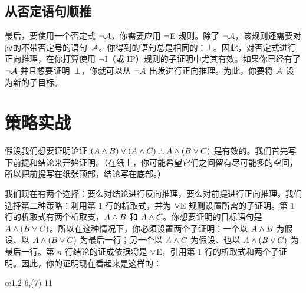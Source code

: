 \subsection*{从否定语句顺推}

最后，要使用一个否定式 $\neg \mathcal{A}$，你需要应用 $\neg$E 规则。除了 $\neg \mathcal{A}$，该规则还需要对应的不带否定号的语句~$\mathcal{A}$。你得到的语句总是相同的：$\bot$。因此，对否定式进行正向推理，在你打算使用 $\neg$I（或 IP）规则的子证明中尤其有效。如果你已经有了 $\neg \mathcal{A}$ 并且想要证明~$\bot$，你就可以从 $\neg \mathcal{A}$ 出发进行正向推理。为此，你要将 $\mathcal{A}$ 设为新的子目标。

\begin{fitchproof}
	\ellipsesline
\end{fitchproof}

\section{策略实战}

假设我们想要证明论证 $(A \eand B) \eor (A \eand C) \therefore A \eand (B \eor C)$ 是有效的。我们首先写下前提和结论来开始证明。（在纸上，你可能希望它们之间留有尽可能多的空间，所以把前提写在纸张顶部，结论写在底部。）


\begin{fitchproof}
   \PR
\ellipsesline
\end{fitchproof}


我们现在有两个选择：要么对结论进行反向推理，要么对前提进行正向推理。我们选择第二种策略：利用第 $1$ 行的析取式，并为 $\vee$E 规则设置所需的子证明。第 $1$ 行的析取式有两个析取支，$A \wedge B$ 和 $A \wedge C$。你想要证明的目标语句是 $A \wedge (B \vee C)$。所以在这种情况下，你必须设置两个子证明：一个以 $A \wedge B$ 为假设、以 $A \wedge (B \vee C)$ 为最后一行；另一个以 $A \wedge C$ 为假设、也以 $A \wedge (B \vee C)$ 为最后一行。第 $n$ 行结论的证成依据将是 $\vee$E，引用第 $1$ 行的析取式和两个子证明。因此，你的证明现在看起来是这样的：


\begin{fitchproof}
	\PR
	\open
	\AS
	\ellipsesline
	\close
	\open
	\AS
	\ellipsesline
	\close
	\oe{1,2-6,(7)-11}
\end{fitchproof}


